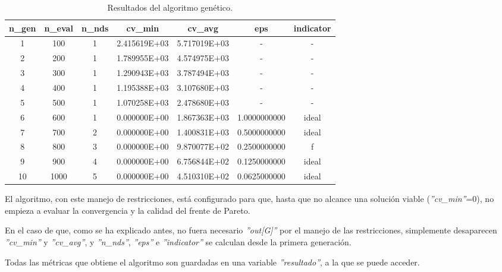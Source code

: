 \begin{table}[h!]
    \centering
    \small %
    \begin{tabularx}{\textwidth}{@{}ccccccc@{}}
        \toprule
        \textbf{n\_gen} & \textbf{n\_eval} & \textbf{n\_nds} & \textbf{cv\_min} & \textbf{cv\_avg} & \textbf{eps} & \textbf{indicator} \\ 
        \midrule
         1 &   100 &  1 & 2.415619E+03 & 5.717019E+03 &          - &          - \\ 
         2 &   200 &  1 & 1.789955E+03 & 4.574975E+03 &          - &          - \\ 
         3 &   300 &  1 & 1.290943E+03 & 3.787494E+03 &          - &          - \\ 
         4 &   400 &  1 & 1.195388E+03 & 3.107680E+03 &          - &          - \\ 
         5 &   500 &  1 & 1.070258E+03 & 2.478680E+03 &          - &          - \\ 
         6 &   600 &  1 & 0.000000E+00 & 1.867363E+03 & 1.0000000000 &     ideal \\ 
         7 &   700 &  2 & 0.000000E+00 & 1.400831E+03 & 0.5000000000 &     ideal \\ 
         8 &   800 &  3 & 0.000000E+00 & 9.870077E+02 & 0.2500000000 &         f \\ 
         9 &   900 &  4 & 0.000000E+00 & 6.756844E+02 & 0.1250000000 &     ideal \\ 
        10 &  1000 &  5 & 0.000000E+00 & 4.510310E+02 & 0.0625000000 &     ideal \\ 
        \bottomrule
    \end{tabularx}
    \caption{Resultados del algoritmo genético.}
    \label{tab:optimizacion}
\end{table}

El algoritmo, con este manejo de restricciones, está configurado para que, hasta que no alcance una solución viable (\textit{''cv\_min''}=0), no empieza a evaluar la convergencia y la calidad del frente de Pareto.

En el caso de que, como se ha explicado antes, no fuera necesario \textit{''out[G]''} por el manejo de las restricciones, simplemente desaparecen \textit{''cv\_min''} y \textit{''cv\_avg''}, y \textit{''n\_nds''}, \textit{''eps''} e \textit{''indicator''} se calculan desde la primera generación.

Todas las métricas que obtiene el algoritmo son guardadas en una variable \textit{''resultado''}, a la que se puede acceder.

